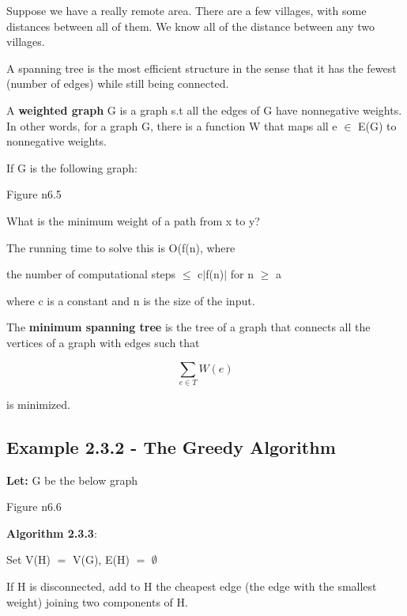 \documentclass{article}
\newcommand{\mt}[1]{\ensuremath{#1}}
\newcommand\ssc[2][\DefaultOpt]{%
  \def\DefaultOpt{#2}%
  \subsection[#1]{#2}%
}
\newcommand{\lt}[1]{\textbf{Let: } #1}
\newcommand{\mem}{\mt{\in} }
\newcommand{\es}{\mt{\emptyset} }        %
\newcommand{\av}[1]{\mt{|}#1\mt{|}}  %
\newcommand{\lse}{\mt{\operatorname{\leq}} }
\newcommand{\gre}{\mt{\operatorname{\geq}} }
\newcommand{\eql}{ \mt{\operatorname{=}} }
\newcommand{\eqn}[1]{\[#1\]}
\begin{document}
{{Suppose we have a really remote area. There are a few villages, with some distances between all of them. We know all of the distance between any two villages.

A spanning tree is the most efficient structure in the sense that it has the fewest (number of edges) while still being connected.

A \textbf{weighted graph} G is a graph s.t all the edges of G have nonnegative weights. In other words, for a graph G, there is a function W that maps all e \mem E(G) to nonnegative weights.

If G is the following graph:

Figure n6.5

What is the minimum weight of a path from x to y?

The running time to solve this is O(f(n), where

the number of computational steps \lse c\av{f(n)} for n \gre a

where c is a constant and n is the size of the input.

The \textbf{minimum spanning tree} is the tree of a graph that connects all the vertices of a graph with edges such that

\eqn{\sum_{e \mem T} W(e)}

is minimized.
}

\ssc{Example 2.3.2 - The Greedy Algorithm}{
\lt{G be the below graph}

Figure n6.6

\textbf{Algorithm 2.3.3}:

Set V(H) \eql V(G), E(H) \eql \es

If H is disconnected, add to H the cheapest edge (the edge with the smallest weight) joining two components of H.

}

}
\end{document}
